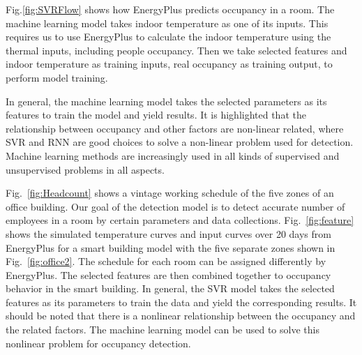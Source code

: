 Fig.\ref{fig:SVRFlow} shows how EnergyPlus predicts occupancy in a room. The
machine learning model takes indoor temperature as one of its inputs. This
requires us to use EnergyPlus to calculate the indoor temperature using the
thermal inputs, including people occupancy. Then we take selected features and
indoor temperature as training inputs, real occupancy as training output, to
perform model training.

In general, the machine learning model takes the selected parameters
as its features to train the model and yield results. It is highlighted
that the relationship between occupancy and other factors are
non-linear related, where SVR and RNN are good choices to
solve a non-linear problem used for detection. Machine learning methods are
increasingly used in all kinds of supervised and unsupervised problems
in all aspects.

Fig.~\ref{fig:Headcount} shows a vintage working schedule of the five
zones of an office building. Our goal of the detection model is to
detect accurate number of employees in a room by certain parameters
and data collections. Fig.~\ref{fig:feature} shows the simulated
temperature curves and input curves over 20 days from EnergyPlus for a
smart building model with the five separate zones shown in
Fig.~\ref{fig:office2}. The schedule for each room can be assigned
differently by EnergyPlus. The selected features are then combined
together to occupancy behavior in the smart building. In general, the
SVR model takes the selected features as its parameters to train the
data and yield the corresponding results. It should be noted that
there is a nonlinear relationship between the occupancy and the
related factors. The machine learning model can be used to solve this
nonlinear problem for occupancy detection.


